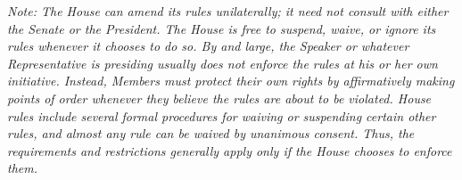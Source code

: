 \emph{Note: The House can amend its rules unilaterally; it need not consult with either the Senate or the President. The House is free to suspend, waive, or ignore its rules whenever it chooses to do so. By and large, the Speaker or whatever Representative is presiding usually does not enforce the rules at his or her own initiative. Instead, Members must protect their own rights by affirmatively making points of order whenever they believe the rules are about to be violated. House rules include several formal procedures for waiving or suspending certain other rules, and almost any rule can be waived by unanimous consent. Thus, the requirements and restrictions generally apply only if the House chooses to enforce them.}
